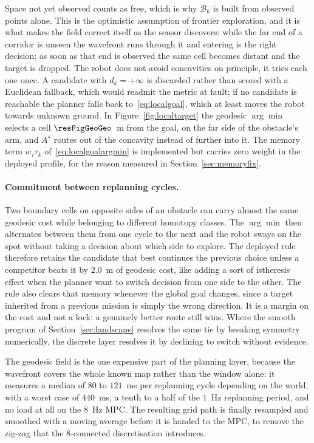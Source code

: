 \documentclass[11pt,a4paper]{article}
\newcommand{\astar}{$A^\star$}
\begin{document}
Space not yet observed counts as free, which is why $\mathcal{B}_k$ is built from observed points alone.
This is the optimistic assumption of frontier exploration, and it is what makes the field correct itself as
the sensor discovers: while the far end of a corridor is unseen the wavefront runs through it and entering
is the right decision; as soon as that end is observed the same cell becomes distant and the target is
dropped. The robot does not avoid concavities on principle, it tries each one once. A candidate with
$d_k=+\infty$ is discarded rather than scored with a Euclidean fallback, which would readmit the metric at
fault; if no candidate is reachable the planner falls back to~\eqref{eq:localgoal}, which at least moves
the robot towards unknown ground. In Figure~\ref{fig:localtarget} the geodesic $\arg\min$ selects a cell
$\resFigGeoGeo$~m from the goal, on the far side of the obstacle's arm, and \astar{} routes out of the
concavity instead of further into it. The memory term $w_\tau\tau_k$ of~\eqref{eq:localgoalargmin} is
implemented but carries zero weight in the deployed profile, for the reason measured in
Section~\ref{sec:memoryfix}.



\paragraph{Commitment between replanning cycles.} Two boundary cells on opposite sides of an obstacle can
carry almost the same geodesic cost while belonging to different homotopy classes. The $\arg\min$ then
alternates between them from one cycle to the next and the robot sways on the spot without taking a decision about which side to explore. The deployed rule therefore retains the candidate that best continues the previous choice
unless a competitor beats it by $2.0$~m of geodesic cost, like adding a sort of istheresis effect when the planner want to switch decision from one side to the other. The rule also clears that memory whenever the global goal
changes, since a target inherited from a previous mission is simply the wrong direction. It is a margin on
the cost and not a lock: a genuinely better route still wins. Where the smooth program of Section~\ref{sec:landscape}
resolves the same tie by breaking symmetry numerically, the discrete layer resolves it by declining to
switch without evidence.

The geodesic field is the one expensive part of the planning layer, because the wavefront covers the whole
known map rather than the window alone: it measures a median of $80$ to $121$~ms per replanning cycle
depending on the world, with a worst case of $440$~ms, a tenth to a half of the
$1$~Hz replanning period, and no load at all on the $8$~Hz MPC. The resulting grid path is finally
resampled and smoothed with a moving average before it is handed to the MPC, to remove the zig-zag that the
$8$-connected discretisation introduces.
\end{document}
